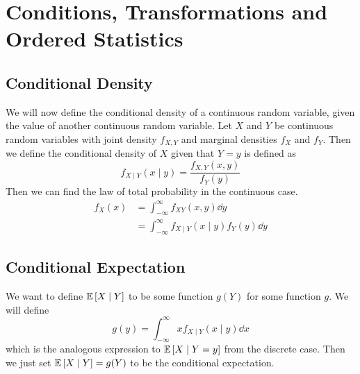 \documentclass{article}
\begin{document}
\section{Conditions, Transformations and Ordered Statistics}
\subsection{Conditional Density}
We will now define the conditional density of a continuous random variable, given the value of another continuous random variable. Let $X$ and $Y$ be continuous random variables with joint density $f_{X, Y}$ and marginal densities $f_X$ and $f_Y$. Then we define the conditional density of $X$ given that $Y = y$ is defined as
\[ f_{X \mid Y}(x \mid y) = \frac{f_{X, Y}(x, y)}{f_Y(y)} \]
Then we can find the law of total probability in the continuous case.
\begin{align*}
    f_X(x) & = \int_{-\infty}^\infty f_{XY}(x, y) \dd{y}                 \\
           & = \int_{-\infty}^\infty f_{X \mid Y}(x \mid y)f_Y(y) \dd{y}
\end{align*}

\subsection{Conditional Expectation}
We want to define $\mathbb{E}\left[{X \mid Y}\right]$ to be some function $g(Y)$ for some function $g$. We will define
\[ g(y) = \int_{-\infty}^\infty xf_{X \mid Y}(x \mid y) \dd{x} \]
which is the analogous expression to $\mathbb{E}\left[{X \mid Y = y}\right]$ from the discrete case. Then we just set $\mathbb{E}\left[{X \mid Y}\right] = g(Y)$ to be the conditional expectation.
\end{document}
